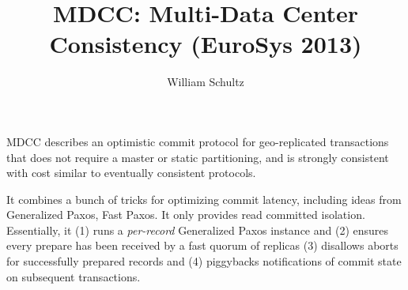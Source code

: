 \documentclass[11pt, oneside]{article}   	%
\title{MDCC: Multi-Data Center Consistency (EuroSys 2013)}
\author{William Schultz}
\begin{document}
\maketitle


MDCC \cite{2013mdcc} describes an optimistic commit protocol for geo-replicated transactions that does not require a master or static partitioning, and is strongly consistent with cost similar to eventually consistent protocols.

It combines a bunch of tricks for optimizing commit latency, including ideas from Generalized Paxos, Fast Paxos. It only provides read committed isolation. Essentially, it (1) runs a \textit{per-record} Generalized Paxos instance and (2) ensures every prepare has been received by a fast quorum of replicas (3) disallows aborts for successfully prepared records and (4) piggybacks notifications of commit state on subsequent transactions. 

 

\end{document}
